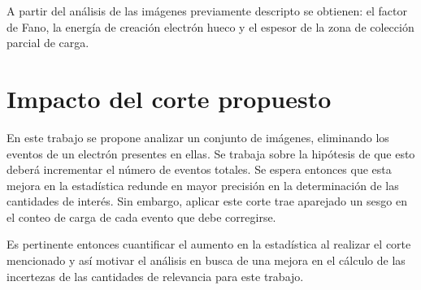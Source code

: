 A partir del análisis de las imágenes previamente descripto se obtienen: el factor de Fano, la energía de creación electrón hueco y el espesor de la zona de colección parcial de carga.

\section{Impacto del corte propuesto}
\noindent En este trabajo se propone analizar un conjunto de imágenes, eliminando los eventos de un electrón presentes en ellas. Se trabaja sobre la hipótesis de que esto deberá incrementar el número de eventos totales. Se espera entonces que esta mejora en la estadística redunde en mayor precisión en la determinación de las cantidades de interés. Sin embargo, aplicar este corte trae aparejado un sesgo en el conteo de carga de cada evento que debe corregirse.

Es pertinente entonces cuantificar el aumento en la estadística al realizar el corte mencionado y así motivar el análisis en busca de una mejora en el cálculo de las incertezas de las cantidades de relevancia para este trabajo.

